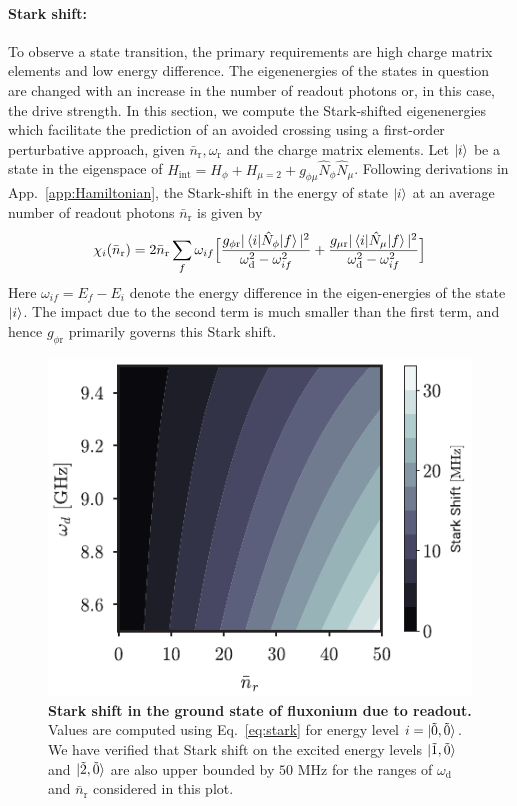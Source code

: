 \documentclass[%
reprint,
superscriptaddress,
 amsmath,amssymb,
 aps,
 prx,
longbibliography,
floatfix,
]{revtex4-2}
\begin{document}
\paragraph{Stark shift:}\label{app:stark-shift}
To observe a state transition, the primary requirements are high charge matrix elements and low energy difference. The eigenenergies of the states in question are changed with an increase in the number of readout photons or, in this case, the drive strength. In this section, we compute the Stark-shifted eigenenergies which facilitate the prediction of an avoided crossing using a first-order perturbative approach, given $\bar n_\textrm{r}, \omega_\textrm{r}$ and the charge matrix elements.  Let $\ket{i}$ be a state in the eigenspace of $H_{\textrm{int}}=H_\phi+H_{\mu=2}+g_{\phi\mu}\hat N_\phi\hat N_\mu$. Following derivations in App.~\ref{app:Hamiltonian}, the Stark-shift in the energy of state $\ket{i}$ at an average number of readout photons $\bar n_\textrm{r}$ is given by
\begin{align}
    \chi_i(\bar n_\textrm{r})=2\bar n_\textrm{r}\sum_{f}\omega_{if}\Big[\frac{g_{\phi \textrm{r}}|\braket{i|\hat N_\phi|f}|^2}{\omega_\textrm{d}^2-\omega_{if}^2}+\frac{g_{\mu \textrm{r}}|\braket{i|\hat N_\mu|f}|^2}{\omega_\textrm{d}^2-\omega_{if}^2}\Big]\label{eq:stark}
\end{align}
 Here $\omega_{if}=E_f-E_i$ denote the energy difference in the eigen-energies of the state $\ket{i}$. The impact due to the second term is much smaller than the first term, and hence $g_{\phi \textrm{r}}$ primarily governs this Stark shift.
 \begin{figure}
     \centering
     \includegraphics[width=\linewidth]{Supp_Fig/Stark-shift.pdf}
     \caption{\textbf{Stark shift in the ground state of fluxonium due to readout.} Values are computed using Eq.~\ref{eq:stark} for energy level $i=\ket{\tilde{0},\tilde{0}}$. We have verified that Stark shift on the excited energy levels $\ket{\tilde{1},\tilde{0}}$ and $\ket{\tilde{2},\tilde{0}}$ are also upper bounded by $50$ MHz for the ranges of $\omega_\textrm{d}$ and $ \bar n_\textrm{r}$ considered in this plot.}
     \label{fig:stark-shift}
 \end{figure}
\end{document}
